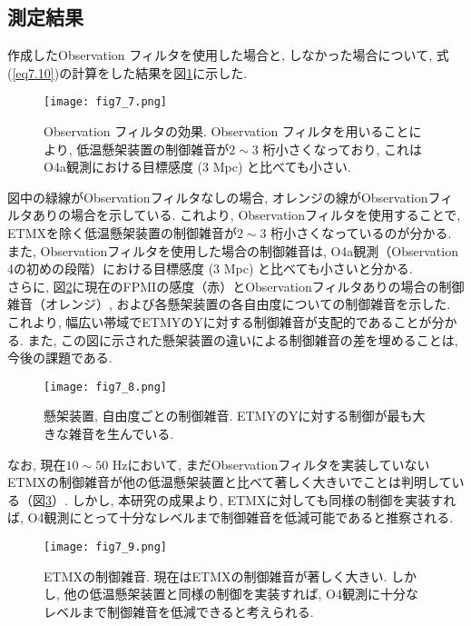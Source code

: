 \subsection{測定結果}
作成したObservation フィルタを使用した場合と, しなかった場合について, 式(\ref{eq7.10})の計算をした結果を図\ref{fig7.7}に示した. 
\begin{figure}[H]
\begin{center}
\texttt{[image: fig7\_7.png]}
\caption[Observation フィルタの効果]{Observation フィルタの効果. Observation フィルタを用いることにより, 低温懸架装置の制御雑音が$2\sim3$ 桁小さくなっており, これはO4a観測における目標感度 (3 Mpc) と比べても小さい. }
\label{fig7.7}
\end{center}
\end{figure}
図中の緑線がObservationフィルタなしの場合, オレンジの線がObservationフィルタありの場合を示している. これより, Observationフィルタを使用することで, ETMXを除く低温懸架装置の制御雑音が$2\sim3$ 桁小さくなっているのが分かる. また, Observationフィルタを使用した場合の制御雑音は, O4a観測（Observation 4の初めの段階）における目標感度 (3 Mpc) と比べても小さいと分かる.\\
\quad さらに, 図\ref{fig7.8}に現在のFPMIの感度（赤）とObservationフィルタありの場合の制御雑音（オレンジ）, および各懸架装置の各自由度についての制御雑音を示した. これより, 幅広い帯域でETMYのYに対する制御雑音が支配的であることが分かる. また, この図に示された懸架装置の違いによる制御雑音の差を埋めることは, 今後の課題である.
\begin{figure}[H]
\begin{center}
\texttt{[image: fig7\_8.png]}
\caption[懸架装置, 自由度ごとの制御雑音]{懸架装置, 自由度ごとの制御雑音. ETMYのYに対する制御が最も大きな雑音を生んでいる.}
\label{fig7.8}
\end{center}
\end{figure}
なお, 現在$10\sim50$ Hzにおいて, まだObservationフィルタを実装していないETMXの制御雑音が他の低温懸架装置と比べて著しく大きいでことは判明している（図\ref{fig7.9}）. しかし, 本研究の成果より, ETMXに対しても同様の制御を実装すれば, O4観測にとって十分なレベルまで制御雑音を低減可能であると推察される.
\begin{figure}[H]
\begin{center}
\texttt{[image: fig7\_9.png]}
\caption[ETMXの制御雑音]{ETMXの制御雑音. 現在はETMXの制御雑音が著しく大きい. しかし, 他の低温懸架装置と同様の制御を実装すれば, O4観測に十分なレベルまで制御雑音を低減できると考えられる.}
\label{fig7.9}
\end{center}
\end{figure}
